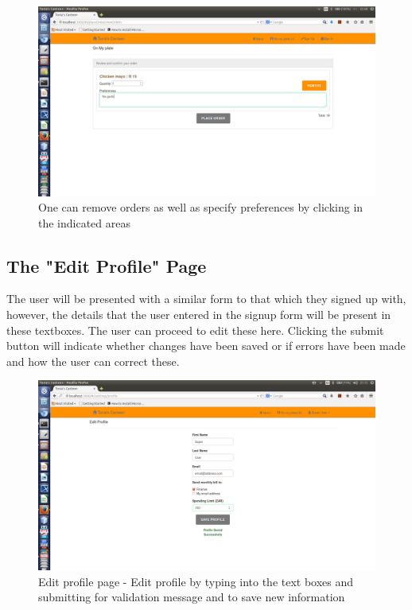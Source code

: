 \documentclass[a4paper,12pt]{report}
\begin{document}
\begin{figure}[H]
  \centering
    \includegraphics[width=1.0\textwidth]{screenshots/viewOrder3.png}
    \caption{One can remove orders as well as specify preferences by clicking in the indicated areas} 
\end{figure}

\subsection{The "Edit Profile" Page} 
The user will be presented with a similar form to that which they signed up with, however, the details that the user entered in the signup form will be present in these textboxes. The user can proceed to edit these here. Clicking the submit button will indicate whether changes have been saved or if errors have been made and how the user can correct these.

\begin{figure}[H]
  \centering
    \includegraphics[width=1.0\textwidth]{screenshots/editProfile.png}
    \caption{Edit profile page - Edit profile by typing into the text boxes and submitting for validation message and to save new information } 
\end{figure}
\end{document}
